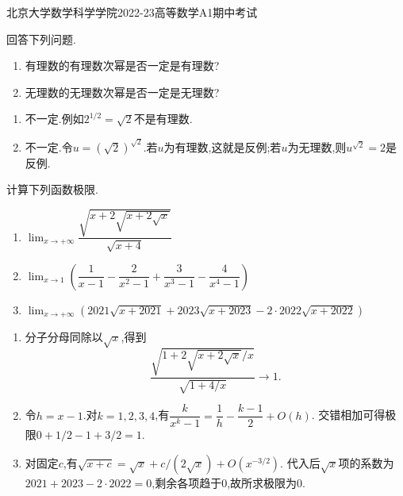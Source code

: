 \documentclass{ctexart}
\begin{document}
\pagestyle{empty}
\begin{center}\Large
    北京大学数学科学学院2022-23高等数学A1期中考试
\end{center}
\begin{problem}[1.(5\songti{分})]
回答下列问题.
        \begin{enumerate}[label=\textbf{(\arabic*)}]
            \item 有理数的有理数次幂是否一定是有理数?
            \item 无理数的无理数次幂是否一定是无理数?
        \end{enumerate}
\end{problem}
\begin{solution}
\begin{enumerate}[label=\textbf{(\arabic*)}]
\item 不一定.例如$2^{1/2}=\sqrt2$不是有理数.
\item 不一定.令$u=(\sqrt2)^{\sqrt2}$.若$u$为有理数,这就是反例;若$u$为无理数,则$u^{\sqrt2}=2$是反例.
\end{enumerate}
\end{solution}
\begin{problem}[2.(15\songti{分})]
计算下列函数极限.
        \begin{enumerate}[label=\textbf{(\arabic*)}]
            \item $\displaystyle\lim_{x\to+\infty}\dfrac{\sqrt{x+2\sqrt{x+2\sqrt{x}}}}{\sqrt{x+4}}$
            \item $\displaystyle\lim_{x\to1}(\dfrac{1}{x-1}-\dfrac{2}{x^2-1}+\dfrac{3}{x^3-1}-\dfrac{4}{x^4-1})$
            \item $\displaystyle\lim_{x\to+\infty}(2021\sqrt{x+2021}+2023\sqrt{x+2023}-2\cdot2022\sqrt{x+2022})$
        \end{enumerate}
\end{problem}
\begin{solution}
\begin{enumerate}[label=\textbf{(\arabic*)}]
\item 分子分母同除以$\sqrt x$,得到
\[\dfrac{\sqrt{1+2\sqrt{x+2\sqrt x}/x}}{\sqrt{1+4/x}}\to1.\]
\item 令$h=x-1$.对$k=1,2,3,4$,有$\dfrac{k}{x^k-1}=\dfrac1h-\dfrac{k-1}{2}+O(h)$.
交错相加可得极限$0+1/2-1+3/2=1$.
\item 对固定$c$,有$\sqrt{x+c}=\sqrt x+c/(2\sqrt x)+O(x^{-3/2})$.
代入后$\sqrt x$项的系数为$2021+2023-2\cdot2022=0$,剩余各项趋于$0$,故所求极限为$0$.
\end{enumerate}
\end{solution}
\end{document}

